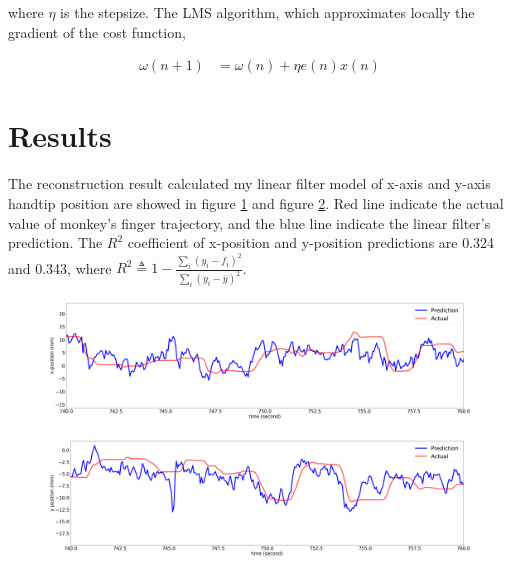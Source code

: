 \documentclass[8pt,a4paper]{article}
\begin{document}
\begin{multicols}{2}
where $ \eta $ is the stepsize. The LMS algorithm, which approximates locally the gradient of the cost function, 

\begin{align}
  \omega(n+1) &= \omega(n) + \eta e(n) x(n)
\end{align}



\section*{Results}

The reconstruction result calculated my linear filter model of x-axis and y-axis handtip position are showed in figure \ref{fig:x_pos} and figure \ref{fig:y_pos}. 
Red line indicate the actual value of monkey's finger trajectory, and the blue line indicate the linear filter's prediction. 
The $R^2$ coefficient of x-position and y-position predictions are 0.324 and 0.343, where $R^2 \triangleq 1 - \frac{ \sum_{i} (y_i-f_i)^2 }{  \sum_{i} (y_i-\bar{y})^2 }$.

\end{multicols}

\begin{figure}[H]
  \begin{center}
      \includegraphics[width=500pt]{./Figures/X_position_prediction.png}
      \caption{}
      \label{fig:x_pos}
  \end{center}
\end{figure}


\begin{figure}[H]
  \begin{center}
      \includegraphics[width=500pt]{./Figures/Y_position_prediction.png}
      \caption{}
      \label{fig:y_pos}
  \end{center}
\end{figure}


\begin{multicols}{2}






 \label{sec:references}
\newpage

\end{multicols}
\end{document}
